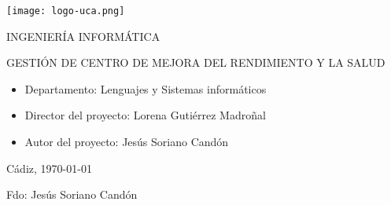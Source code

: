 


\begin{center}

  \texttt{[image: logo-uca.png]} \\

  \vspace{2.5cm}


  \vspace{1.0cm}

  \large{INGENIERÍA INFORMÁTICA} \\

  \vspace{2.0cm}

  \large{GESTIÓN DE CENTRO DE MEJORA DEL RENDIMIENTO Y LA SALUD} \\

  \vspace{2.5cm}

\end{center}

\begin{itemize}
\item \large{Departamento: Lenguajes y Sistemas informáticos}
\item \large{Director del proyecto: Lorena Gutiérrez Madroñal}
\item \large{Autor del proyecto: Jesús Soriano Candón}
\end{itemize}

\vspace{0.2cm}

\begin{flushright}
  \large{Cádiz, \today} \\

  \vspace{2.5cm}

  \large{Fdo: Jesús Soriano Candón}
\end{flushright}
